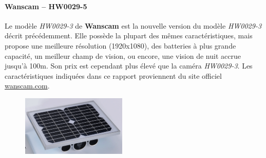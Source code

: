 \paragraph{\textbf{Wanscam} -- HW0029-5}
Le modèle \textit{HW0029-3} de \textbf{Wanscam} est la nouvelle version du modèle \textit{HW0029-3} décrit précédemment. Elle possède la plupart des mêmes caractéristiques, mais propose une meilleure résolution (1920x1080), des batteries à plus grande capacité, un meilleur champ de vision, ou encore, une vision de nuit accrue jusqu'à 100m. Son prix est cependant plus élevé que la caméra \textit{HW0029-3}. Les caractéristiques indiquées dans ce rapport proviennent du site officiel \url{wanscam.com}\autocite{cam:wan5}.

\begin{figure}[h]
    \includegraphics[width=50mm]{img/conception/wan5_cam.png}
    \centering
\end{figure}


